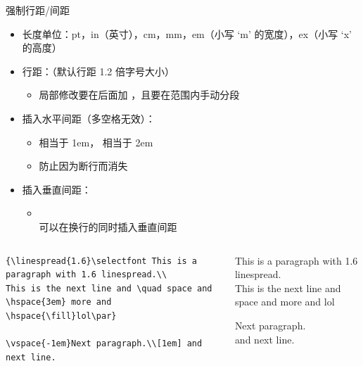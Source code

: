 \begin{frame}[fragile]{强制行距/间距}
\begin{itemize}
    \item 长度单位：pt，in（英寸），cm，mm，em（小写 `m' 的宽度），ex（小写 `x' 的高度）
    \item 行距：\texttt{\linespread{factor}}（默认行距 1.2 倍字号大小）
        \begin{itemize}
            \item 局部修改要在后面加 \texttt{\selectfont}，且要在范围内手动分段
        \end{itemize}
    \item 插入水平间距（多空格无效）：\texttt{\hspace{length}}
        \begin{itemize}
            \item \texttt{\quad} 相当于 1em，\texttt{\qquad} 相当于 2em
            \item \texttt{\hspace*} 防止因为断行而消失
        \end{itemize}
    \item 插入垂直间距：\texttt{\vspace{length}}
        \begin{itemize}
            \item \texttt{\\[1em]} 可以在换行的同时插入垂直间距
        \end{itemize}
\end{itemize}
\pause
\begin{columns}
    \begin{column}{0.5\textwidth}
        \begin{verbatim}
{\linespread{1.6}\selectfont This is a paragraph with 1.6 linespread.\\
This is the next line and \quad space and \hspace{3em} more and
\hspace{\fill}lol\par}

\vspace{-1em}Next paragraph.\\[1em] and next line.
        \end{verbatim}
    \end{column}
    \begin{column}{0.45\textwidth}
        \setlength{\parskip}{.5em}\scriptsize
{\linespread{1.6}\selectfont This is a paragraph with 1.6 linespread.\\
This is the next line and \quad space and \hspace{3em} more and
\hspace{\fill}lol\par}

\vspace{-1em}Next paragraph.\\[1em] and next line.
    \end{column}
\end{columns}
\end{frame}
  
